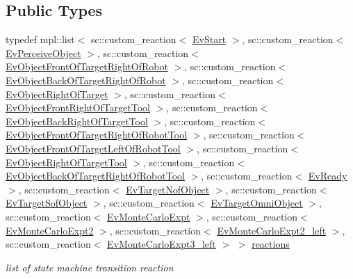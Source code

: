 \subsection*{Public Types}
\begin{DoxyCompactItemize}
\item 
\mbox{\label{structManipulate_a550d7f26727007d60e99c121dc3e2dd6}} 
typedef mpl\+::list$<$ sc\+::custom\+\_\+reaction$<$ \hyperlink{structEvStart}{Ev\+Start} $>$, sc\+::custom\+\_\+reaction$<$ \hyperlink{structEvPerceiveObject}{Ev\+Perceive\+Object} $>$, sc\+::custom\+\_\+reaction$<$ \hyperlink{structEvObjectFrontOfTargetRightOfRobot}{Ev\+Object\+Front\+Of\+Target\+Right\+Of\+Robot} $>$, sc\+::custom\+\_\+reaction$<$ \hyperlink{structEvObjectBackOfTargetRightOfRobot}{Ev\+Object\+Back\+Of\+Target\+Right\+Of\+Robot} $>$, sc\+::custom\+\_\+reaction$<$ \hyperlink{structEvObjectRightOfTarget}{Ev\+Object\+Right\+Of\+Target} $>$, sc\+::custom\+\_\+reaction$<$ \hyperlink{structEvObjectFrontRightOfTargetTool}{Ev\+Object\+Front\+Right\+Of\+Target\+Tool} $>$, sc\+::custom\+\_\+reaction$<$ \hyperlink{structEvObjectBackRightOfTargetTool}{Ev\+Object\+Back\+Right\+Of\+Target\+Tool} $>$, sc\+::custom\+\_\+reaction$<$ \hyperlink{structEvObjectFrontOfTargetRightOfRobotTool}{Ev\+Object\+Front\+Of\+Target\+Right\+Of\+Robot\+Tool} $>$, sc\+::custom\+\_\+reaction$<$ \hyperlink{structEvObjectFrontOfTargetLeftOfRobotTool}{Ev\+Object\+Front\+Of\+Target\+Left\+Of\+Robot\+Tool} $>$, sc\+::custom\+\_\+reaction$<$ \hyperlink{structEvObjectRightOfTargetTool}{Ev\+Object\+Right\+Of\+Target\+Tool} $>$, sc\+::custom\+\_\+reaction$<$ \hyperlink{structEvObjectBackOfTargetRightOfRobotTool}{Ev\+Object\+Back\+Of\+Target\+Right\+Of\+Robot\+Tool} $>$, sc\+::custom\+\_\+reaction$<$ \hyperlink{structEvReady}{Ev\+Ready} $>$, sc\+::custom\+\_\+reaction$<$ \hyperlink{structEvTargetNofObject}{Ev\+Target\+Nof\+Object} $>$, sc\+::custom\+\_\+reaction$<$ \hyperlink{structEvTargetSofObject}{Ev\+Target\+Sof\+Object} $>$, sc\+::custom\+\_\+reaction$<$ \hyperlink{structEvTargetOmniObject}{Ev\+Target\+Omni\+Object} $>$, sc\+::custom\+\_\+reaction$<$ \hyperlink{structEvMonteCarloExpt}{Ev\+Monte\+Carlo\+Expt} $>$, sc\+::custom\+\_\+reaction$<$ \hyperlink{structEvMonteCarloExpt2}{Ev\+Monte\+Carlo\+Expt2} $>$, sc\+::custom\+\_\+reaction$<$ \hyperlink{structEvMonteCarloExpt2__left}{Ev\+Monte\+Carlo\+Expt2\+\_\+left} $>$, sc\+::custom\+\_\+reaction$<$ \hyperlink{structEvMonteCarloExpt3__left}{Ev\+Monte\+Carlo\+Expt3\+\_\+left} $>$ $>$ \hyperlink{structManipulate_a550d7f26727007d60e99c121dc3e2dd6}{reactions}
\begin{DoxyCompactList}\small\item\em list of state machine transition reaction \end{DoxyCompactList}\end{DoxyCompactItemize}
